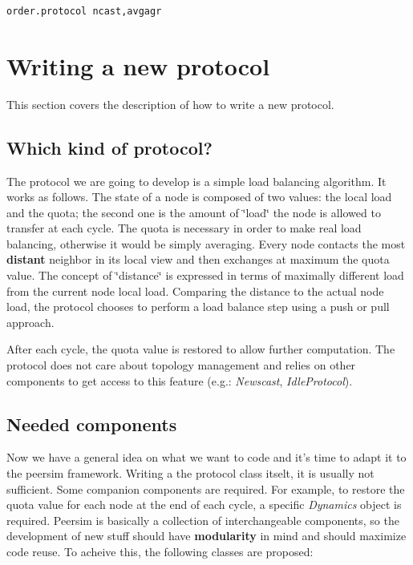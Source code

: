 \documentclass[a4paper,11pt]{article}
\begin{document}
\begin{verbatim}
order.protocol ncast,avgagr
\end{verbatim}

\section{Writing a new protocol}

This section covers the description of how to write a new protocol. 


\subsection{Which kind of protocol?}

The protocol we are going to develop is a simple load balancing algorithm.
It works as follows. The state of a node is composed of two values:
the local load and the quota; the second one is the amount of \char`\"{}load\char`\"{}
the node is allowed to transfer at each cycle. The quota is necessary
in order to make real load balancing, otherwise it would be simply
averaging. Every node contacts the most \textbf{distant} neighbor
in its local view and then exchanges at maximum the quota value. The
concept of \char`\"{}distance\char`\"{} is expressed in terms of maximally
different load from the current node local load. Comparing the distance
to the actual node load, the protocol chooses to perform a load balance
step using a push or pull approach.

After each cycle, the quota value is restored to allow further computation.
The protocol does not care about topology management and relies on
other components to get access to this feature (e.g.: \emph{Newscast},
\emph{IdleProtocol}). 


\subsection{Needed components}

Now we have a general idea on what we want to code and it's time to
adapt it to the peersim framework. Writing a the protocol class itselt,
it is usually not sufficient. Some companion components are required.
For example, to restore the quota value for each node at the end of
each cycle, a specific \emph{Dynamics} object is required. Peersim
is basically a collection of interchangeable components, so the development
of new stuff should have \textbf{modularity} in mind and should maximize
code reuse. To acheive this, the following classes are proposed:
\end{document}
